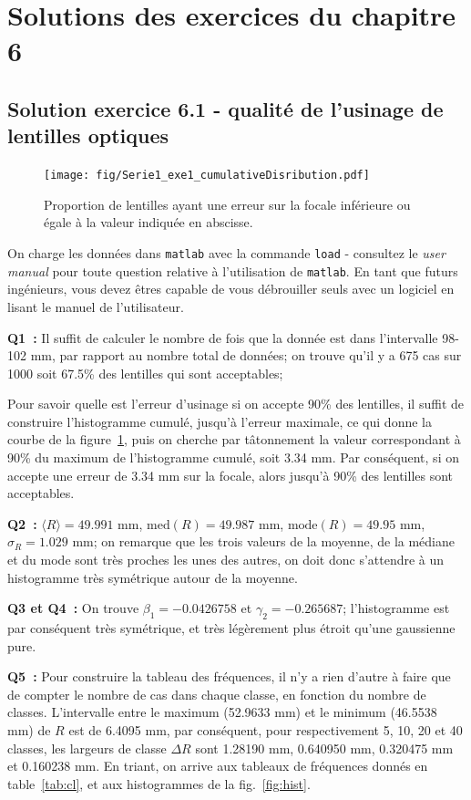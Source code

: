\section{Solutions des exercices du chapitre 6}

\subsection*{Solution exercice 6.1 - qualité de l'usinage de lentilles optiques}

\begin{figure}
   \centering
   \texttt{[image: fig/Serie1\_exe1\_cumulativeDisribution.pdf]}
   \caption{Proportion de lentilles ayant une erreur sur la focale inférieure ou égale à la valeur indiquée en abscisse.}
   \label{fig:01}
\end{figure}
On charge les données dans \texttt{matlab} avec la commande \texttt{load} - consultez le \textit{user manual} pour toute question relative à l'utilisation de \texttt{matlab}. En tant que futurs ingénieurs, vous devez êtres capable de vous débrouiller seuls avec un logiciel en lisant le manuel de l'utilisateur.

\textbf{Q1~:} Il suffit de calculer le nombre de fois que la donnée est dans l'intervalle 98-102 mm, par rapport au nombre total de données; on trouve qu'il y a 675 cas sur 1000 soit 67.5\% des lentilles qui sont acceptables;

Pour savoir quelle est l'erreur d'usinage si on accepte 90\% des lentilles, il suffit de construire l'histogramme cumulé, jusqu'à l'erreur maximale, ce qui donne la courbe de la figure~\ref{fig:01}, puis on cherche par tâtonnement la valeur correspondant à 90\% du maximum de l'histogramme cumulé, soit 3.34 mm. Par conséquent, si on accepte une erreur de 3.34 mm sur la focale, alors jusqu'à 90\% des lentilles sont acceptables.

\textbf{Q2~:} $\langle R\rangle=49.991$ mm, $\text{med}(R)=49.987$ mm, $\text{mode}(R)=49.95$ mm, $\sigma_R=1.029$ mm; on remarque que les trois valeurs de la moyenne, de la médiane et du mode sont très proches les unes des autres, on doit donc s'attendre à un histogramme très symétrique autour de la moyenne.

\textbf{Q3 et Q4~:} On trouve $\beta_1=-0.0426758$ et $\gamma_2=-0.265687$; l'histogramme est par conséquent très symétrique, et très légèrement plus étroit qu'une gaussienne pure.

\textbf{Q5~:} Pour construire la tableau des fréquences, il n'y a rien d'autre à faire que de compter le nombre de cas dans chaque classe, en fonction du nombre de classes. L'intervalle entre le maximum (52.9633 mm) et le minimum (46.5538 mm) de $R$ est de 6.4095 mm, par conséquent, pour respectivement 5, 10, 20 et 40 classes, les largeurs de classe $\Delta R$ sont 1.28190 mm, 0.640950 mm, 0.320475 mm et 0.160238 mm. En triant, on arrive aux tableaux de fréquences donnés en table~\ref{tab:cl}, et aux histogrammes de la fig.~\ref{fig:hist}.

